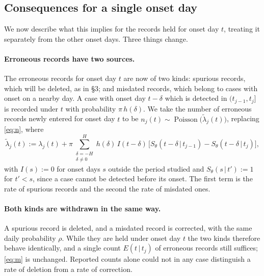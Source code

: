 \documentclass[11pt,a4paper]{article}
\newcommand{\given}{\,|\,}
\newcommand{\pois}{\operatorname{Poisson}}
\begin{document}
\subsection{Consequences for a single onset day}

We now describe what this implies for the records held for onset day $t$,
treating it separately from the other onset days. Three things change.

\paragraph{Erroneous records have two sources.} The erroneous records for onset
day $t$ are now of two kinds: spurious records, which will be deleted, as in
\S3; and misdated records, which belong to cases with onset on a nearby day.
A case with onset day $t-\delta$ which is detected in $(t_{j-1},t_j]$ is
recorded under $t$ with probability $\pi\,h(\delta)$. We take the number of
erroneous records newly entered for onset day $t$ to be
$n_j(t)\sim\pois\bigl(\tilde\lambda_j(t)\bigr)$, replacing \eqref{eq:n}, where
\begin{equation}\label{eq:lambdatilde}
\tilde\lambda_j(t) := \lambda_j(t)
+ \pi\sum_{\substack{\delta=-H\\ \delta\neq 0}}^{H} h(\delta)\,I(t-\delta)\,
\bigl[S_\theta(t-\delta\given t_{j-1})-S_\theta(t-\delta\given t_j)\bigr],
\end{equation}
with $I(s):=0$ for onset days $s$ outside the period studied and
$S_\theta(s\given t'):=1$ for $t'<s$, since a case cannot be detected before
its onset. The first term is the rate of spurious records and the second the
rate of misdated ones.

\paragraph{Both kinds are withdrawn in the same way.} A spurious record is
deleted, and a misdated record is corrected, with the same daily probability
$\rho$. While they are held under onset day $t$ the two kinds therefore behave
identically, and a single count $E(t\given t_j)$ of erroneous records still
suffices; \eqref{eq:m} is unchanged. Reported counts alone could not in any case
distinguish a rate of deletion from a rate of correction.
\end{document}

